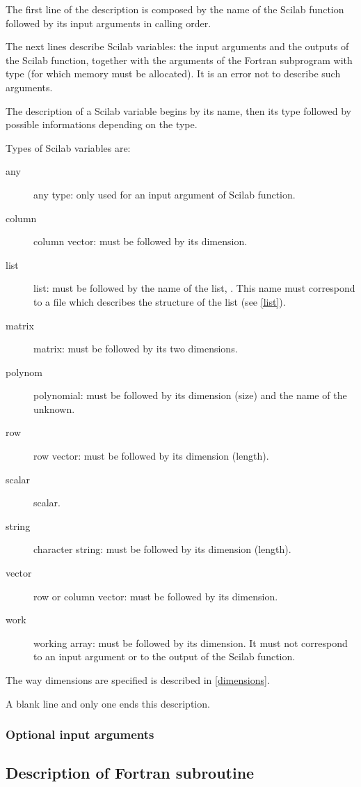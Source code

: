 The first line of the description is composed by the name of the Scilab
function followed by its input arguments in calling order.

The next lines describe Scilab variables: the input arguments and the
outputs of the Scilab function, together with the arguments of the Fortran
subprogram with type  (for which memory must be allocated).
It is an error not to describe such arguments.

The description of a Scilab variable begins by its name, then its type followed
by possible informations depending on the type.

Types of Scilab variables are:
\begin{description}
  \item[any] any type: only used for an input argument of Scilab function.
  \item[column] column vector: must be followed by its dimension.
  \item[list] list: must be followed by the name of the list,
. This name must correspond to a file 
which describes the structure of the list (see \ref{list}).
  \item[matrix] matrix: must be followed by its two dimensions.
  \item[polynom] polynomial: must be followed by its dimension (size) and the
name of the unknown.
  \item[row] row vector: must be followed by its dimension (length).
  \item[scalar] scalar.
  \item[string] character string: must be followed by its dimension (length).
  \item[vector] row or column vector: must be followed by its dimension.
  \item[work] working array: must be followed by its dimension. It must not
correspond to an input argument or to the output of the Scilab function.
\end{description}

The way dimensions are specified is described in 
\ref{dimensions}.
\smallskip

A blank line and only one ends this description.

\subsubsection{Optional input arguments}

\subsection{Description of Fortran subroutine}
\label{fortran}

